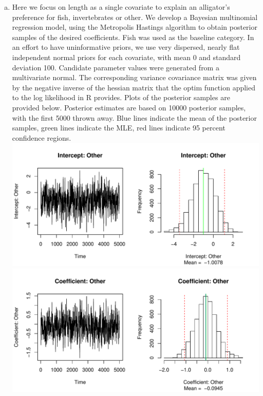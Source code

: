 \documentclass[12pt]{article}
\begin{document}
\begin{enumerate}
\begin{enumerate}[(a)]
	\item Here we focus on length as a single covariate to explain an alligator's preference for fish, invertebrates or other. We develop a Bayesian multinomial regression model, using the Metropolis Hastings algorithm to obtain posterior samples of the desired coefficients. Fish was used as the baseline category. In an effort to have uninformative priors, we use very dispersed, nearly flat independent normal priors for each covariate, with mean 0 and standard deviation 100. Candidate parameter values were generated from a multivariate normal. The corresponding variance covariance matrix was given by the negative inverse of the hessian matrix that the optim function applied to the log likelihood in R provides. Plots of the posterior samples are provided below. Posterior estimates are based on 10000 posterior samples, with the first 5000 thrown away. Blue lines indicate the mean of the posterior samples, green lines indicate the MLE, red lines indicate 95 percent confidence regions.  \\
	\newline
	\includegraphics[scale = .7]{plot3.pdf} \\
	\includegraphics[scale = .7]{plot4.pdf} \\

\end{enumerate}
\end{enumerate}
\end{document}
